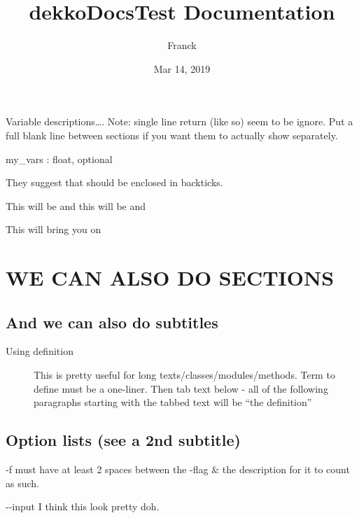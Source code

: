 \documentclass[letterpaper,10pt,english]{sphinxmanual}
\title{dekkoDocsTest Documentation}
\date{Mar 14, 2019}
\author{Franck}
\begin{document}
\maketitle
\sphinxtableofcontents
{}\label{\detokenize{index::doc}}


Variable descriptions….
Note: single line return (like so) seem to be ignore. Put a full blank line between sections if you want them to actually show separately.

my\_vars : float, optional

They suggest that  should be enclosed in backticks.

This will be  and this will be  and 

This will bring you on 


\chapter{WE CAN ALSO DO SECTIONS}
\label{\detokenize{index:title}}\label{\detokenize{index:module-deep_thought}}\label{\detokenize{index:we-can-also-do-sections}}\label{\detokenize{index:welcome-to-dekkodocstest-s-documentation}}

\section{And we can also do subtitles}
\label{\detokenize{index:and-we-can-also-do-subtitles}}\begin{description}
\item[{Using definition}] \leavevmode
This is pretty useful for long texts/classes/modules/methods. Term to define must be a one-liner. Then tab text below - all of the following paragraphs starting with the tabbed text will be “the definition”

\end{description}


\section{Option lists (see a 2nd subtitle)}
\label{\detokenize{index:option-lists-see-a-2nd-subtitle}}\begin{optionlist}{3cm}
\item [-f]  
must have at least 2 spaces between the -flag \& the description for it to count as such.
\item [-{-}input]  
I think this look pretty doh.
\end{optionlist}
\end{document}

